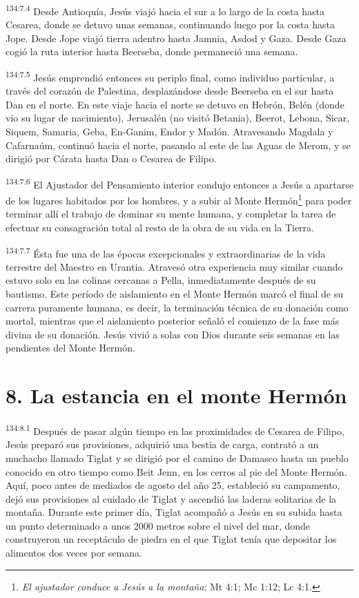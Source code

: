 \par
\textsuperscript{134:7.4} Desde Antioquía, Jesús viajó hacia el sur a lo largo de la costa hasta Cesarea, donde se detuvo unas semanas, continuando luego por la costa hasta Jope. Desde Jope viajó tierra adentro hasta Jamnia, Asdod y Gaza. Desde Gaza cogió la ruta interior hasta Beerseba, donde permaneció una semana.

\par
\textsuperscript{134:7.5} Jesús emprendió entonces su periplo final, como individuo particular, a través del corazón de Palestina, desplazándose desde Beerseba en el sur hasta Dan en el norte. En este viaje hacia el norte se detuvo en Hebrón, Belén (donde vio su lugar de nacimiento), Jerusalén (no visitó Betania), Beerot, Lebona, Sicar, Siquem, Samaria, Geba, En-Ganim, Endor y Madón. Atravesando Magdala y Cafarnaúm, continuó hacia el norte, pasando al este de las Aguas de Merom, y se dirigió por Cárata hasta Dan o Cesarea de Filipo.

\par
\textsuperscript{134:7.6} El Ajustador del Pensamiento interior condujo entonces a Jesús a apartarse de los lugares habitados por los hombres, y a subir al Monte Hermón\footnote{\textit{El ajustador conduce a Jesús a la montaña}: Mt 4:1; Mc 1:12; Lc 4:1.} para poder terminar allí el trabajo de dominar su mente humana, y completar la tarea de efectuar su consagración total al resto de la obra de su vida en la Tierra.

\par
\textsuperscript{134:7.7} Ésta fue una de las épocas excepcionales y extraordinarias de la vida terrestre del Maestro en Urantia. Atravesó otra experiencia muy similar cuando estuvo solo en las colinas cercanas a Pella, inmediatamente después de su bautismo. Este período de aislamiento en el Monte Hermón marcó el final de su carrera puramente humana, es decir, la terminación técnica de su donación como mortal, mientras que el aislamiento posterior señaló el comienzo de la fase más divina de su donación. Jesús vivió a solas con Dios durante seis semanas en las pendientes del Monte Hermón.

\section*{8. La estancia en el monte Hermón}
\par
\textsuperscript{134:8.1} Después de pasar algún tiempo en las proximidades de Cesarea de Filipo, Jesús preparó sus provisiones, adquirió una bestia de carga, contrató a un muchacho llamado Tiglat y se dirigió por el camino de Damasco hasta un pueblo conocido en otro tiempo como Beit Jenn, en los cerros al pie del Monte Hermón. Aquí, poco antes de mediados de agosto del año 25, estableció su campamento, dejó sus provisiones al cuidado de Tiglat y ascendió las laderas solitarias de la montaña. Durante este primer día, Tiglat acompañó a Jesús en su subida hasta un punto determinado a unos 2000 metros sobre el nivel del mar, donde construyeron un receptáculo de piedra en el que Tiglat tenía que depositar los alimentos dos veces por semana.

